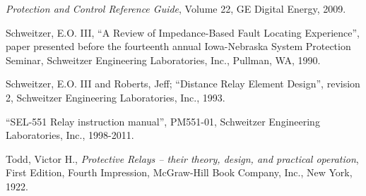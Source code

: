 \vskip 10pt

\noindent
\textit{Protection and Control Reference Guide}, Volume 22, GE Digital Energy, 2009.

\vskip 10pt

\noindent
Schweitzer, E.O. III, ``A Review of Impedance-Based Fault Locating Experience'', paper presented before the fourteenth annual Iowa-Nebraska System Protection Seminar, Schweitzer Engineering Laboratories, Inc., Pullman, WA, 1990.

\vskip 10pt

\noindent
Schweitzer, E.O. III and Roberts, Jeff; ``Distance Relay Element Design'', revision 2, Schweitzer Engineering Laboratories, Inc., 1993.

\vskip 10pt

\noindent
``SEL-551 Relay instruction manual'', PM551-01, Schweitzer Engineering Laboratories, Inc., 1998-2011.

\vskip 10pt

\noindent
Todd, Victor H., \textit{Protective Relays -- their theory, design, and practical operation}, First Edition, Fourth Impression, McGraw-Hill Book Company, Inc., New York, 1922.



















